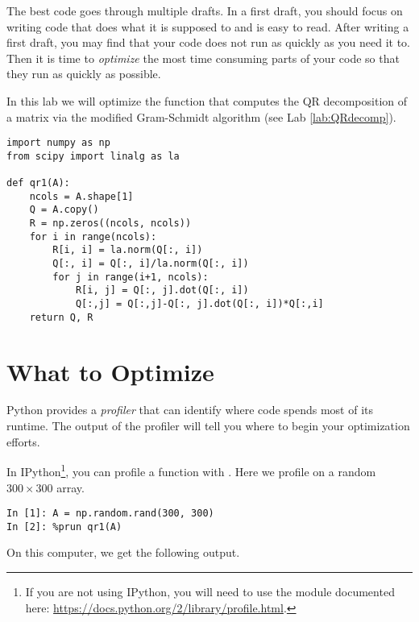 \label{lab:ProfilingCode}

The best code goes through multiple drafts.
In a first draft, you should focus on writing code that does what it is supposed to and is easy to read.
After writing a first draft, you may find that your code does not run as quickly as you need it to.
Then it is time to \emph{optimize} the most time consuming parts of your code so that they run as quickly as possible.

In this lab we will optimize the function  that computes the QR decomposition of a matrix via the modified Gram-Schmidt algorithm (see Lab \ref{lab:QRdecomp}).
\begin{lstlisting}
import numpy as np
from scipy import linalg as la

def qr1(A):
    ncols = A.shape[1]
    Q = A.copy()
    R = np.zeros((ncols, ncols))
    for i in range(ncols):
        R[i, i] = la.norm(Q[:, i])
        Q[:, i] = Q[:, i]/la.norm(Q[:, i])
        for j in range(i+1, ncols):
            R[i, j] = Q[:, j].dot(Q[:, i])
            Q[:,j] = Q[:,j]-Q[:, j].dot(Q[:, i])*Q[:,i]
    return Q, R
\end{lstlisting}

\section*{What to Optimize}
Python provides a \emph{profiler} that can identify where code spends most of its runtime.
The output of the profiler will tell you where to begin your optimization efforts.

In IPython\footnote{If you are not using IPython, you will need to use the  module documented here: \url{https://docs.python.org/2/library/profile.html}.},
you can profile a function with .
Here we profile  on a random $300 \times 300$ array.
\begin{lstlisting}
In [1]: A = np.random.rand(300, 300)
In [2]: %prun qr1(A)
\end{lstlisting}

On this computer, we get the following output.

